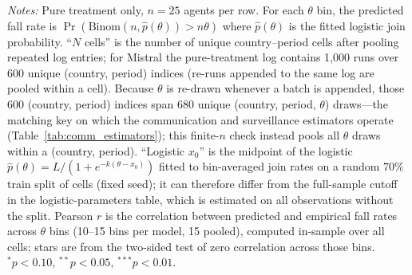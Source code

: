 \begin{table}[htbp]
\centering
\small
\caption{Finite-$n$ benchmark: predicted vs.\ empirical regime fall rates}
\label{tab:finite_n}
\begin{tablenotes}
\small
\textit{Notes:} Pure treatment only, $n = 25$ agents per row. For each $\theta$ bin, the predicted fall rate is
$\Pr(\text{Binom}(n, \hat{p}(\theta)) > n\theta)$ where $\hat{p}(\theta)$
is the fitted logistic join probability.
``$N$ cells'' is the number of unique country--period cells after pooling repeated log entries;
for Mistral the pure-treatment log contains 1{,}000 runs over 600 unique (country, period) indices
(re-runs appended to the same log are pooled within a cell).
Because $\theta$ is re-drawn whenever a batch is appended, those 600 (country, period) indices span
680 unique (country, period, $\theta$) draws---the matching key on which the communication and
surveillance estimators operate (Table~\ref{tab:comm_estimators}); this finite-$n$ check instead
pools all $\theta$ draws within a (country, period).
``Logistic $x_0$'' is the midpoint of the logistic $\hat{p}(\theta) = L/(1+e^{-k(\theta - x_0)})$
fitted to bin-averaged join rates on a random 70\% train split of cells (fixed seed);
it can therefore differ from the full-sample cutoff in the logistic-parameters table,
which is estimated on all observations without the split.
Pearson $r$ is the correlation between predicted and empirical fall rates across $\theta$ bins
(10--15 bins per model, 15 pooled), computed in-sample over all cells; stars are from the
two-sided test of zero correlation across those bins.
${}^{*}p<0.10$, ${}^{**}p<0.05$, ${}^{***}p<0.01$.
\end{tablenotes}
\end{table}